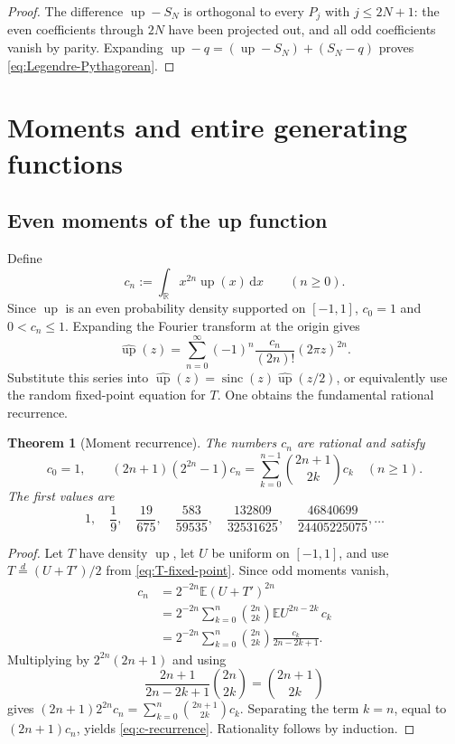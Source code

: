 \documentclass[11pt]{article}
\numberwithin{equation}{section}
\newtheorem{theorem}{Theorem}[section]
\theoremstyle{definition}
\theoremstyle{remark}
\newcommand{\R}{\mathbb R}
\newcommand{\upf}{\operatorname{up}}
\newcommand{\sinc}{\operatorname{sinc}}
\newcommand{\dd}{\,\mathrm d}
\begin{document}
\begin{proof}
The difference $\upf-S_N$ is orthogonal to every $P_j$ with $j\le2N+1$: the even coefficients through $2N$ have been projected out, and all odd coefficients vanish by parity.  Expanding $\upf-q=(\upf-S_N)+(S_N-q)$ proves \eqref{eq:Legendre-Pythagorean}.
\end{proof}


\section{Moments and entire generating functions}\label{sec:moments}

\subsection{Even moments of the up function}

Define
\begin{equation}\label{eq:cndef}
 c_n:=\int_{\R}x^{2n}\upf(x)\dd x\qquad(n\ge0).
\end{equation}
Since $\upf$ is an even probability density supported on $[-1,1]$, $c_0=1$ and $0<c_n\le1$.  Expanding the Fourier transform at the origin gives
\begin{equation}\label{eq:Fourier-moment-series}
 \widehat{\upf}(z)=\sum_{n=0}^{\infty}(-1)^n\frac{c_n}{(2n)!}(2\pi z)^{2n}.
\end{equation}
Substitute this series into $\widehat{\upf}(z)=\sinc(z)\widehat{\upf}(z/2)$, or equivalently use the random fixed-point equation for $T$.  One obtains the fundamental rational recurrence.

\begin{theorem}[Moment recurrence]\label{thm:c-recurrence}
The numbers $c_n$ are rational and satisfy
\begin{equation}\label{eq:c-recurrence}
 c_0=1,
 \qquad
 (2n+1)(2^{2n}-1)c_n
 =\sum_{k=0}^{n-1}\binom{2n+1}{2k}c_k
 \quad(n\ge1).
\end{equation}
The first values are
\begin{equation}\label{eq:c-values}
 1,\quad \frac19,\quad \frac{19}{675},\quad
 \frac{583}{59535},\quad \frac{132809}{32531625},\quad
 \frac{46840699}{24405225075},\ldots
\end{equation}
\end{theorem}

\begin{proof}
Let $T$ have density $\upf$, let $U$ be uniform on $[-1,1]$, and use
$T\stackrel d=(U+T')/2$ from \eqref{eq:T-fixed-point}.  Since odd moments vanish,
\begin{align*}
 c_n
 &=2^{-2n}\mathbb E(U+T')^{2n}\\
 &=2^{-2n}\sum_{k=0}^{n}\binom{2n}{2k}
       \mathbb E U^{2n-2k}\,c_k\\
 &=2^{-2n}\sum_{k=0}^{n}\binom{2n}{2k}
       \frac{c_k}{2n-2k+1}.
\end{align*}
Multiplying by $2^{2n}(2n+1)$ and using
\[
 \frac{2n+1}{2n-2k+1}\binom{2n}{2k}=\binom{2n+1}{2k}
\]
gives
$(2n+1)2^{2n}c_n=\sum_{k=0}^{n}\binom{2n+1}{2k}c_k$.
Separating the term $k=n$, equal to $(2n+1)c_n$, yields \eqref{eq:c-recurrence}.  Rationality follows by induction.
\end{proof}
\end{document}
